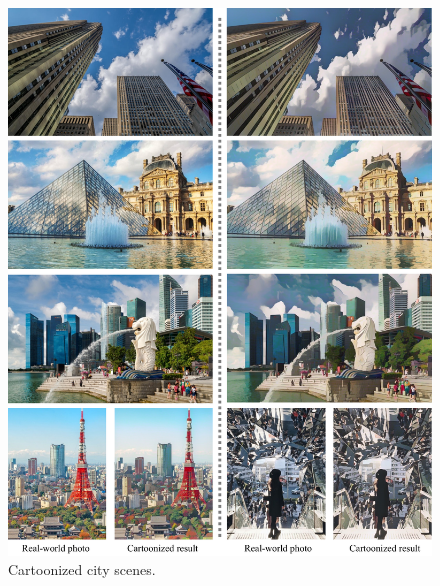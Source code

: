 \documentclass[10pt,twocolumn,letterpaper]{article}
\begin{document}
\begin{figure}[b]
\vspace{-0.5em}
\centering
\includegraphics[width=\linewidth]{figures/city2.pdf}
\caption{Cartoonized city scenes.}
\label{fig:city2}
\end{figure}

\clearpage

{\small  }
\end{document}
